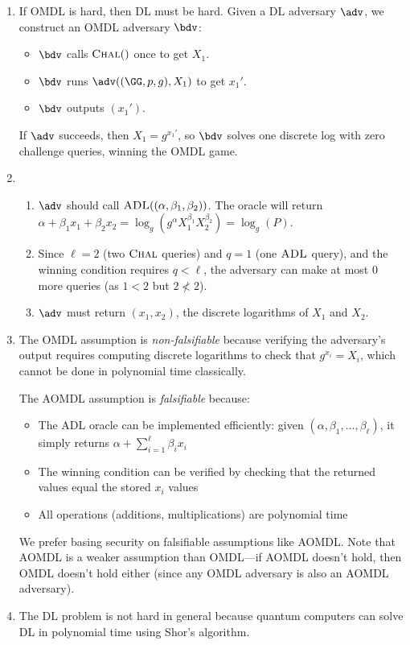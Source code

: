\begin{enumerate}
  \item If OMDL is hard, then DL must be hard.
        Given a DL adversary $\adv$, we construct an OMDL adversary $\bdv$:
        \begin{itemize}
          \item $\bdv$ calls ${\normalfont\textsc{Chal}}()$ once to get $X_1$.
          \item $\bdv$ runs $\adv(\gparam, X_1)$ to get $x_1'$.
          \item $\bdv$ outputs $(x_1')$.
        \end{itemize}
        If $\adv$ succeeds, then $X_1 = g^{x_1'}$, so $\bdv$ solves one discrete log with zero challenge queries, winning the OMDL game.
  \item \begin{enumerate}
          \item $\adv$ should call ${\normalfont\textsc{ADL}}((\alpha, \beta_1, \beta_2))$. The oracle will return $\alpha + \beta_1 x_1 + \beta_2 x_2 = \log_g(g^\alpha X_1^{\beta_1} X_2^{\beta_2}) = \log_g(P)$.
          \item Since $\ell = 2$ (two ${\normalfont\textsc{Chal}}$ queries) and $q = 1$ (one ${\normalfont\textsc{ADL}}$ query), and the winning condition requires $q < \ell$, the adversary can make at most 0 more queries (as $1 < 2$ but $2 \not< 2$).
          \item $\adv$ must return $(x_1, x_2)$, the discrete logarithms of $X_1$ and $X_2$.
        \end{enumerate}

  \item The OMDL assumption is \emph{non-falsifiable} because verifying the adversary's output requires computing discrete logarithms to check that $g^{x_i} = X_i$, which cannot be done in polynomial time classically.

        The AOMDL assumption is \emph{falsifiable} because:
        \begin{itemize}
          \item The ADL oracle can be implemented efficiently: given $(\alpha, \beta_1, \ldots, \beta_\ell)$, it simply returns $\alpha + \sum_{i=1}^\ell \beta_i x_i$
          \item The winning condition can be verified by checking that the returned values equal the stored $x_i$ values
          \item All operations (additions, multiplications) are polynomial time
        \end{itemize}

        We prefer basing security on falsifiable assumptions like AOMDL. Note that AOMDL is a weaker assumption than OMDL---if AOMDL doesn't hold, then OMDL doesn't hold either (since any OMDL adversary is also an AOMDL adversary).

  \item The DL problem is not hard in general because quantum computers can solve DL in polynomial time using Shor's algorithm.
\end{enumerate}
